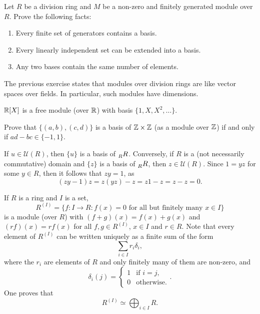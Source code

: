 \begin{exercise}
\label{xca:linear_algebra}
    Let $R$ be a division ring and $M$ be a non-zero and finitely generated module over $R$.
    Prove the following facts:
    \begin{enumerate}
        \item Every finite set of generators contains a basis.
        \item Every linearly independent set can be extended into a basis.
        \item Any two bases contain the same number of elements.
    \end{enumerate}
\end{exercise}

The previous exercise states that modules over division rings 
are like vector spaces over fields. In particular, 
such modules have dimensions.

\begin{example}
    $\mathbb{R}[X]$ is a free module (over $\mathbb{R}$) with basis $\{1,X,X^2,\dots\}$. 
\end{example}

\begin{exercise}
    Prove that $\{(a,b),(c,d)\}$ is a basis of $\mathbb{Z}\times\mathbb{Z}$ 
    (as a module over $\mathbb{Z}$) if and only if
    $ad-bc\in\{-1,1\}$. 
\end{exercise}

\begin{example}
If $u\in\mathcal{U}(R)$, then $\{u\}$ is a basis of $\prescript{}{R}R$. Conversely, if $R$ is a (not necessarily commutative) domain and 
$\{z\}$ is a basis of $\prescript{}{R}R$, then $z\in\mathcal{U}(R)$. Since 
$1=yz$ for some $y\in R$, then it follows that $zy=1$, as  
\[
(zy-1)z=z(yz)-z=z1-z=z-z=0.
\]	
\end{example}

If $R$ is a ring and $I$ is a set, 
\[
R^{(I)}=\{f\colon I\to R:f(x)=0\text{ for all but finitely many $x\in I$}\}
\]
is a module (over $R$) with 
$(f+g)(x)=f(x)+g(x)$ and $(rf)(x)=rf(x)$ for all $f,g\in R^{(I)}$, $x\in I$ and $r\in R$. 
Note that 
every element 
of $R^{(I)}$ can be written uniquely as
a finite sum of the form 
\[
\sum_{i\in I}r_i\delta_i,
\]
where the $r_i$ are elements of $R$ and only finitely many of them are non-zero, and 
\[
\delta_i(j)=\begin{cases}
1 & \text{if $i=j$},\\
0 & \text{otherwise}.
\end{cases}.
\]
One proves
that
\[
R^{(I)}\simeq\bigoplus_{i\in I}R.
\]

